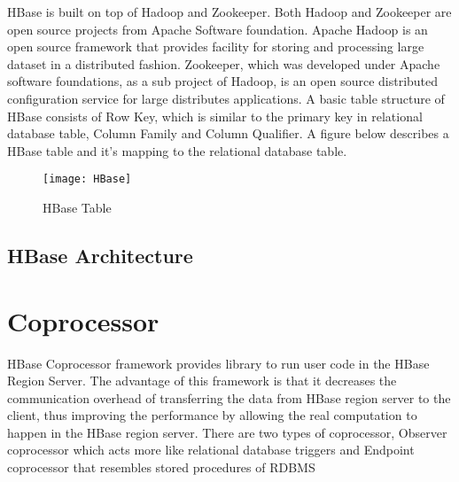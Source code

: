 \documentclass[11pt,a4paper,bibtotoc,idxtotoc,headsepline,footsepline,footexclude,BCOR12mm,DIV13]{scrbook}
\begin{document}
HBase is built on top of Hadoop and Zookeeper\cite{coprocessor:detail}. Both Hadoop and Zookeeper are open source projects from Apache Software foundation. Apache Hadoop is an open source framework that provides facility for storing and processing large dataset in a distributed fashion. Zookeeper, which was developed under Apache software foundations, as a sub project of Hadoop, is an open source distributed configuration service for large distributes applications. A basic table structure of HBase consists of Row Key, which is similar to the primary key in relational database table, Column Family and Column Qualifier. A figure below describes a HBase table and it's mapping to the relational database table.


\begin{figure}
	\centering
	\texttt{[image: HBase]}
	\caption{HBase Table}
	\label{fig:hbasetable}
\end{figure}

\newpage
\subsection{HBase Architecture}
\label{HBase Architecture}


\newpage
\section{Coprocessor}
\label{sec:coprocessor}

HBase Coprocessor framework provides library to run user code in the HBase Region Server. The advantage of this framework is that it decreases the communication overhead of transferring the data from HBase region server to the client, thus improving the performance by allowing the real computation to happen in the HBase region server\cite{coprocessor:coprocessor}. There are two types of coprocessor, Observer coprocessor  which acts more like relational database triggers and Endpoint coprocessor that resembles stored procedures of RDBMS\cite{coprocessor:types} 
\end{document}
